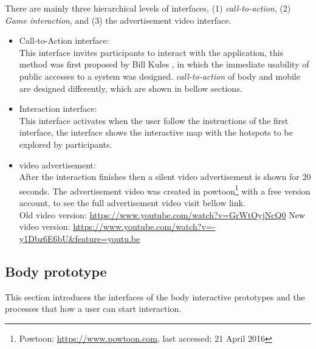 There are mainly three hierarchical levels of interfaces, (1) \emph{call-to-action}, (2) \emph{Game interaction}, and (3) the advertisement video interface.

\begin{itemize}
\item Call-to-Action interface: \\
This interface invites participants to interact with the application, this method was first proposed by Bill Kules \cite{call-to-action}, in which the immediate usability of public accesses to a system was designed. \emph{call-to-action} of body and mobile are designed differently, which are shown in bellow sections. 

\item Interaction interface: \\
This interface activates when the user follow the instructions of the first interface, the interface shows the interactive map with the hotspots to be explored by participants.
\item video advertisement: \\
After the interaction finishes then a silent video advertisement is shown for 20 seconds. 
The advertisement video was created in powtoon\footnote{Powtoon: \url{https://www.powtoon.com}, last accessed: 21 April 2016} with a free version account, to see the full advertisement video visit bellow link.\\ 
Old video version: \url{https://www.youtube.com/watch?v=GrWtOyjNcQ0}
New video version: \url{https://www.youtube.com/watch?v=-y1Dbz6E6bU&feature=youtu.be}
\end{itemize}


\newpage
\subsection{Body prototype}
This section introduces the interfaces of the body interactive prototypes and the processes that how a user can start interaction. \\


